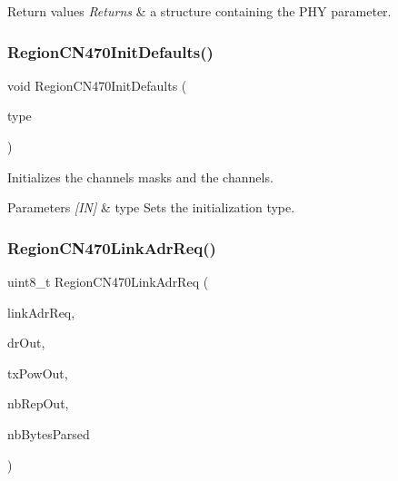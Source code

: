\begin{DoxyRetVals}{Return values}
{\em Returns} & a structure containing the P\+HY parameter. \\
\hline
\end{DoxyRetVals}
\mbox{\label{group__REGIONCN470_ga6591ac8edd635c34b47ec2f21627b145}} 
\subsubsection{\texorpdfstring{Region\+C\+N470\+Init\+Defaults()}{RegionCN470InitDefaults()}}
{\footnotesize\ttfamily void Region\+C\+N470\+Init\+Defaults (\begin{DoxyParamCaption}\item[{\hyperlink{group__REGION_gaddc73ae10673ec925724e7870363bda9}{Init\+Type\+\_\+t}}]{type }\end{DoxyParamCaption})}



Initializes the channels masks and the channels. 


\begin{DoxyParams}{Parameters}
{\em \mbox{[}\+I\+N\mbox{]}} & type Sets the initialization type. \\
\hline
\end{DoxyParams}
\mbox{\label{group__REGIONCN470_ga8390f178b68e708cd9741caba00cb05d}} 
\subsubsection{\texorpdfstring{Region\+C\+N470\+Link\+Adr\+Req()}{RegionCN470LinkAdrReq()}}
{\footnotesize\ttfamily uint8\+\_\+t Region\+C\+N470\+Link\+Adr\+Req (\begin{DoxyParamCaption}\item[{\hyperlink{group__REGION_gad4af503e8d4de1846129e26a799a1e8e}{Link\+Adr\+Req\+Params\+\_\+t} $\ast$}]{link\+Adr\+Req,  }\item[{int8\+\_\+t $\ast$}]{dr\+Out,  }\item[{int8\+\_\+t $\ast$}]{tx\+Pow\+Out,  }\item[{uint8\+\_\+t $\ast$}]{nb\+Rep\+Out,  }\item[{uint8\+\_\+t $\ast$}]{nb\+Bytes\+Parsed }\end{DoxyParamCaption})}



